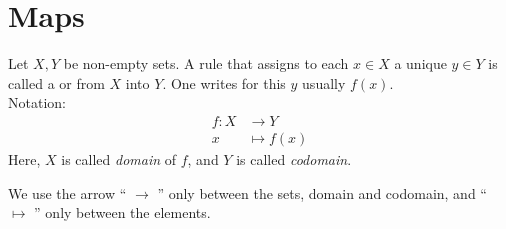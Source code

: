
\section{Maps}%

\begin{Definition}%
Let $X,Y$ be non-empty sets. A rule 
that assigns to 
each  $x\in X$ a unique  $y\in Y$
is called a  or 
from $X$ into $Y$. One writes for this $y$ usually $f(x)$.\\[0.5em]
Notation:\\[-2em]
\begin{align*}
f:X &\rightarrow Y \\
x &\mapsto f(x)
\end{align*}
Here, $X$ is called \emph{domain} of $f$, and $Y$ is called \emph{codomain}. 
\end{Definition} 

\begin{Attention}
We use the arrow `` $\to$ '' only between the sets, domain and codomain,
and `` $\mapsto$ '' only between the elements.
\end{Attention}

